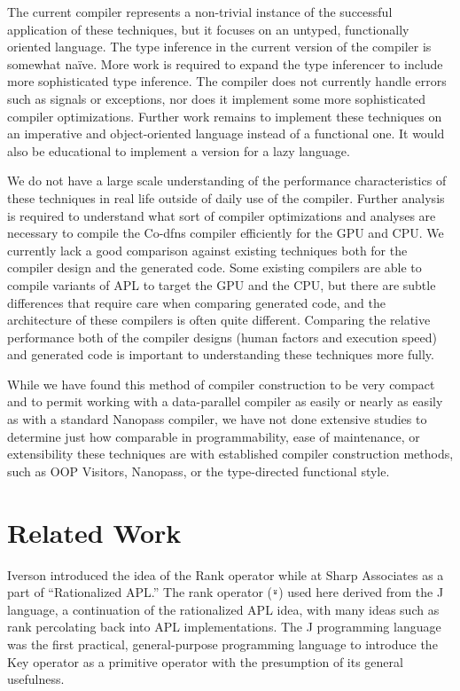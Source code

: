 \documentclass[numbers,9pt]{sigplanconf}
\begin{document}
The current compiler represents a non-trivial instance of
the successful application of these techniques, but it focuses on an untyped, 
functionally oriented language. The type inference in the current version 
of the compiler is somewhat na\"ive. More work is required to expand the 
type inferencer to include more sophisticated type inference. 
The compiler does not currently handle errors such as signals or 
exceptions, nor does it implement some more sophisticated compiler optimizations.
Further work remains to implement these techniques on an imperative and 
object-oriented language instead of a functional one. It would also be 
educational to implement a version for a lazy language. 

We do not have a large scale understanding of the performance characteristics 
of these techniques in real life outside of daily use of the compiler.
Further analysis is
required to understand what sort of compiler optimizations and analyses are 
necessary to compile the Co-dfns compiler efficiently for the GPU and CPU. 
We currently lack a good comparison against existing techniques both for 
the compiler design and the generated code. Some existing compilers are able 
to compile variants of APL to target the GPU and the CPU, but there are subtle 
differences that require care when comparing generated code, and the 
architecture of these compilers is often quite different. Comparing the 
relative performance both of the compiler designs (human factors and execution 
speed) and generated code is important to understanding these techniques more 
fully.

While we have found this method of compiler construction to be very compact 
and to permit working with a data-parallel compiler as easily or nearly as 
easily as with a standard Nanopass compiler, we have not done extensive 
studies to determine just how comparable in programmability, ease of 
maintenance, or extensibility these techniques are with established 
compiler construction methods, such as OOP Visitors, Nanopass, or the 
type-directed functional style.

\section{Related Work}

Iverson introduced the idea of the Rank operator while at Sharp Associates 
\cite{iverson1983rationalized} as a part of ``Rationalized APL.'' 
The rank operator (\verb;⍤;) used here derived from the J language, a 
continuation of the rationalized APL idea, with many ideas such as rank 
percolating back into APL implementations. \cite{bernecky1987rank,hui1995rank}
The J programming language \cite{hui2014key} was the first practical,
general-purpose programming language to introduce the Key operator as a
primitive operator with the presumption of its general usefulness.
\end{document}
